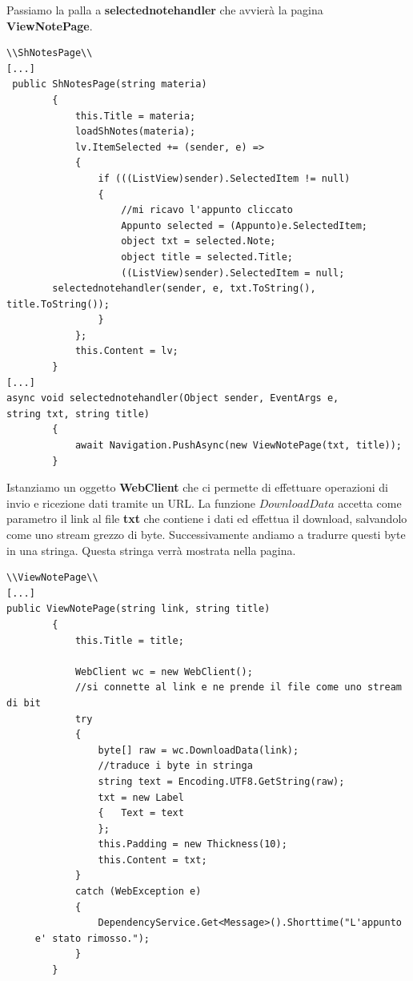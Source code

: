 \documentclass[a4paper, 50pt, twoside]{article}
\begin{document}
Passiamo la palla a \textbf{selectednotehandler} che avvierà la pagina \textbf{ViewNotePage}.
\begin{lstlisting}
\\ShNotesPage\\
[...]
 public ShNotesPage(string materia)
        {
            this.Title = materia;
            loadShNotes(materia);
            lv.ItemSelected += (sender, e) =>
            {
                if (((ListView)sender).SelectedItem != null)
                {
                    //mi ricavo l'appunto cliccato
                    Appunto selected = (Appunto)e.SelectedItem;
                    object txt = selected.Note;
                    object title = selected.Title;
                    ((ListView)sender).SelectedItem = null; 
		selectednotehandler(sender, e, txt.ToString(), title.ToString());
                }
            };
            this.Content = lv;
        }
[...]
async void selectednotehandler(Object sender, EventArgs e, 
string txt, string title)
        {
            await Navigation.PushAsync(new ViewNotePage(txt, title));
        }
\end{lstlisting}
Istanziamo un oggetto \textbf{WebClient} che ci permette di effettuare operazioni di invio e ricezione dati tramite un URL. La funzione $DownloadData$ accetta come parametro il link al file \textbf{txt} che contiene i dati ed effettua il download, salvandolo come uno stream grezzo di byte. Successivamente andiamo a tradurre questi byte in una stringa. Questa stringa verrà mostrata nella pagina. 
\begin{lstlisting}
\\ViewNotePage\\
[...]
public ViewNotePage(string link, string title)
        {
            this.Title = title;

            WebClient wc = new WebClient();
            //si connette al link e ne prende il file come uno stream di bit
            try
            {
                byte[] raw = wc.DownloadData(link);
                //traduce i byte in stringa  
                string text = Encoding.UTF8.GetString(raw);
                txt = new Label
                {	Text = text
                };
                this.Padding = new Thickness(10);
                this.Content = txt;
            }
            catch (WebException e)
            {
                DependencyService.Get<Message>().Shorttime("L'appunto
	 e' stato rimosso.");
            }     
        }
\end{lstlisting}
\end{document}
